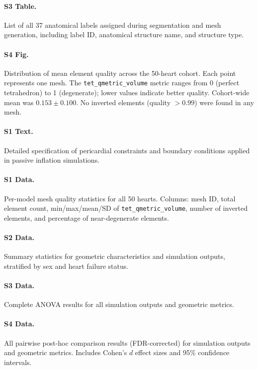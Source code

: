 \documentclass[10pt,letterpaper]{article}
\begin{document}
\paragraph{S3 Table.}
List of all 37 anatomical labels assigned during segmentation and mesh generation,
including label ID, anatomical structure name, and structure type.

\paragraph{S4 Fig.}
Distribution of mean element quality across the 50-heart cohort. Each point represents
one mesh. The \texttt{tet\_qmetric\_volume} metric ranges from 0 (perfect tetrahedron)
to 1 (degenerate); lower values indicate better quality. Cohort-wide mean was
$0.153 \pm 0.100$. No inverted elements (quality $> 0.99$) were found in any mesh.

\paragraph{S1 Text.}
Detailed specification of pericardial constraints and boundary conditions applied in
passive inflation simulations.

\paragraph{S1 Data.}
Per-model mesh quality statistics for all 50 hearts. Columns: mesh ID, total element
count, min/max/mean/SD of \texttt{tet\_qmetric\_volume}, number of inverted elements,
and percentage of near-degenerate elements.

\paragraph{S2 Data.}
Summary statistics for geometric characteristics and simulation outputs, stratified by
sex and heart failure status.

\paragraph{S3 Data.}
Complete ANOVA results for all simulation outputs and geometric metrics.

\paragraph{S4 Data.}
All pairwise post-hoc comparison results (FDR-corrected) for simulation outputs and
geometric metrics. Includes Cohen's $d$ effect sizes and 95\% confidence intervals.
\end{document}
